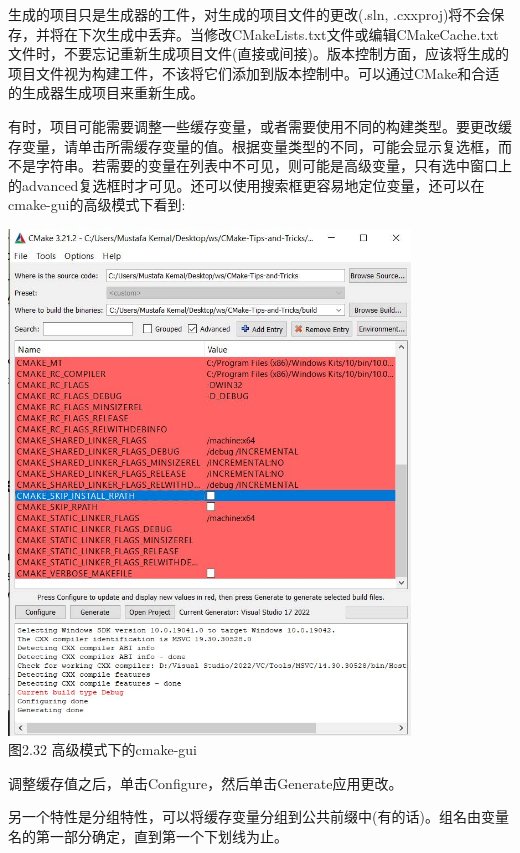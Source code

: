 \begin{tcolorbox}[colback=webgreen!5!white,colframe=webgreen!75!black,title=重要Note]
生成的项目只是生成器的工件，对生成的项目文件的更改(.sln, .cxxproj)将不会保存，并将在下次生成中丢弃。当修改CMakeLists.txt文件或编辑CMakeCache.txt文件时，不要忘记重新生成项目文件(直接或间接)。版本控制方面，应该将生成的项目文件视为构建工件，不该将它们添加到版本控制中。可以通过CMake和合适的生成器生成项目来重新生成。
\end{tcolorbox}

有时，项目可能需要调整一些缓存变量，或者需要使用不同的构建类型。要更改缓存变量，请单击所需缓存变量的值。根据变量类型的不同，可能会显示复选框，而不是字符串。若需要的变量在列表中不可见，则可能是高级变量，只有选中窗口上的advanced复选框时才可见。还可以使用搜索框更容易地定位变量，还可以在cmake-gui的高级模式下看到:

\begin{center}
\includegraphics[width=0.8\textwidth]{content/1/chapter2/images/32.jpg}\\
图2.32 高级模式下的cmake-gui
\end{center}

调整缓存值之后，单击Configure，然后单击Generate应用更改。

\begin{tcolorbox}[colback=webgreen!5!white,colframe=webgreen!75!black,title=Tip]
另一个特性是分组特性，可以将缓存变量分组到公共前缀中(有的话)。组名由变量名的第一部分确定，直到第一个下划线为止。
\end{tcolorbox}

